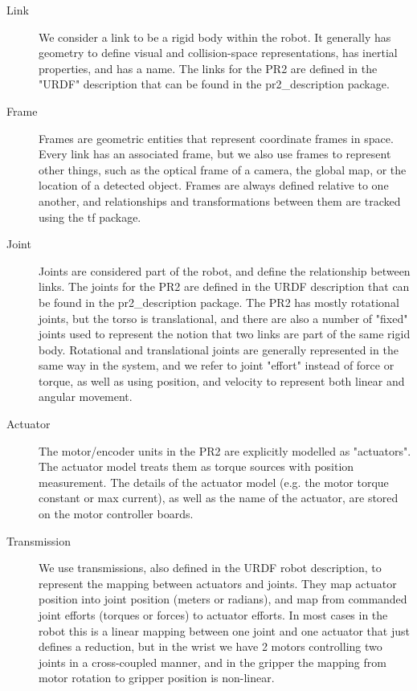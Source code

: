 \begin{description}
\item[Link] We consider a link to be a rigid body within the robot.  It
  generally has geometry to define visual and collision-space representations,
  has inertial properties, and has a name.  The links for the PR2 are defined in
  the "URDF" description that can be found in the pr2\_description package.
\item[Frame] Frames are geometric entities that represent coordinate frames in
  space.  Every link has an associated frame, but we also use frames to
  represent other things, such as the optical frame of a camera, the global map,
  or the location of a detected object.  Frames are always defined relative to
  one another, and relationships and transformations between them are tracked
  using the tf package.
\item[Joint] Joints are considered part of the robot, and define the
  relationship between links.  The joints for the PR2 are defined in the URDF
  description that can be found in the pr2\_description package.  The PR2 has
  mostly rotational joints, but the torso is translational, and there are also a
  number of "fixed" joints used to represent the notion that two links are part
  of the same rigid body.  Rotational and translational joints are generally
  represented in the same way in the system, and we refer to joint "effort"
  instead of force or torque, as well as using position, and velocity to
  represent both linear and angular movement.
\item[Actuator] The motor/encoder units in the PR2 are explicitly modelled as
  "actuators".  The actuator model treats them as torque sources with position
  measurement.  The details of the actuator model (e.g. the motor torque
  constant or max current), as well as the name of the actuator, are stored on
  the motor controller boards.
\item[Transmission] We use transmissions, also defined in the URDF robot
  description, to represent the mapping between actuators and joints.  They map
  actuator position into joint position (meters or radians), and map from
  commanded joint efforts (torques or forces) to actuator efforts.  In most
  cases in the robot this is a linear mapping between one joint and one actuator
  that just defines a reduction, but in the wrist we have 2 motors controlling
  two joints in a cross-coupled manner, and in the gripper the mapping from
  motor rotation to gripper position is non-linear.
\end{description}

